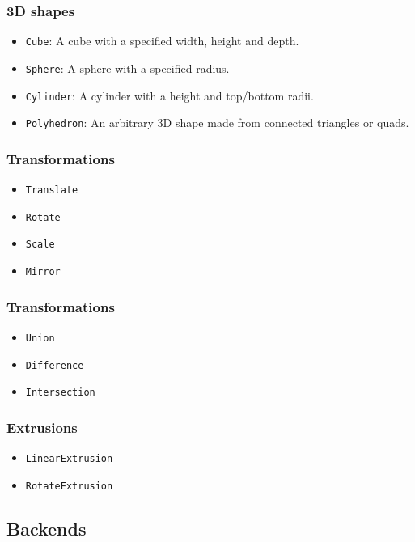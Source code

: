 \subsubsection{3D shapes}

\begin{itemize}
	\item \texttt{Cube}: A cube with a specified width, height and depth.
	\item \texttt{Sphere}: A sphere with a specified radius.
	\item \texttt{Cylinder}: A cylinder with a height and top/bottom radii.
	\item \texttt{Polyhedron}: An arbitrary 3D shape made from connected triangles
		or quads.
\end{itemize}

\subsubsection{Transformations}

\begin{itemize}
	\item \texttt{Translate}
	\item \texttt{Rotate}
	\item \texttt{Scale}
	\item \texttt{Mirror}
\end{itemize}

\subsubsection{Transformations}

\begin{itemize}
	\item \texttt{Union}
	\item \texttt{Difference}
	\item \texttt{Intersection}
\end{itemize}

\subsubsection{Extrusions}

\begin{itemize}
	\item \texttt{LinearExtrusion}
	\item \texttt{RotateExtrusion}
\end{itemize}

\subsection{Backends}\label{sec:overview:backends}

